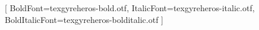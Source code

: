 \usepackage{fontspec}
\setmainfont{texgyreheros-regular.otf}[
  BoldFont=texgyreheros-bold.otf,
  ItalicFont=texgyreheros-italic.otf,
  BoldItalicFont=texgyreheros-bolditalic.otf
]